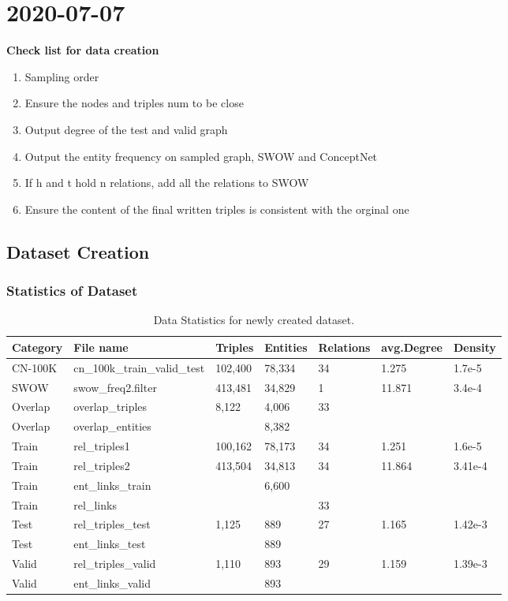 \chapter{2020-07-07}

\textbf{Check list for data creation}
\begin{enumerate}
    \item Sampling order 
    \item Ensure the nodes and triples num to be close 
    \item Output degree of the test and valid graph 
    \item Output the entity frequency on sampled graph, SWOW and ConceptNet
    \item If h and t hold n relations, add all the relations to SWOW
    \item Ensure the content of the final written triples is consistent with the orginal one
\end{enumerate}

\section{Dataset Creation}
\subsection{Statistics of Dataset}
\begin{table}
\centering
    \begin{tabular}{l|llllll}
	\toprule
	 Category & File name & Triples & Entities & Relations & avg.Degree & Density \\
	\midrule
	 CN-100K & cn\_100k\_train\_valid\_test & 102,400 & 78,334 & 34 & 1.275  &1.7e-5 \\
     SWOW & swow\_freq2.filter & 413,481 & 34,829 & 1 &  11.871 & 3.4e-4 \\
    \hline
	 Overlap & overlap\_triples & 8,122 & 4,006 & 33 &  \\
	 Overlap & overlap\_entities &  & 8,382 &  &  \\
    \hline
    Train & rel\_triples1 & 100,162 & 78,173 & 34 & 1.251 & 1.6e-5\\
	Train & rel\_triples2 & 413,504 & 34,813 & 34 & 11.864 & 3.41e-4\\
	Train & ent\_links\_train &  & 6,600 &  \\
	Train & rel\_links &  &  & 33 & \\
    \hline
	Test & rel\_triples\_test & 1,125 & 889 & 27 & 1.165 & 1.42e-3 \\
	Test & ent\_links\_test &  & 889 &  \\
    \hline
	Valid & rel\_triples\_valid & 1,110 & 893 & 29 & 1.159 & 1.39e-3\\
	Valid & ent\_links\_valid &  & 893 &  \\
	\bottomrule
\end{tabular}
\caption{\label{tab:dataset_statistics} Data Statistics for newly created dataset.}
\end{table}


